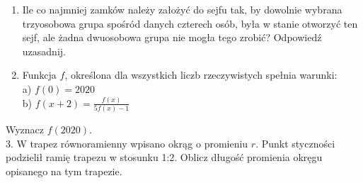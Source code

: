 \documentclass[10pt]{article}
\begin{document}
\begin{enumerate}
  \item Ile co najmniej zamków należy założyć do sejfu tak, by dowolnie wybrana trzyosobowa grupa spośród danych czterech osób, była w stanie otworzyć ten sejf, ale żadna dwuosobowa grupa nie mogła tego zrobić? Odpowiedź uzasadnij.
  \item Funkcja \(f\), określona dla wszystkich liczb rzeczywistych spełnia warunki:\\
a) \(f(0)=2020\)\\
b) \(f(x+2)=\frac{f(x)}{5 f(x)-1}\)
\end{enumerate}

Wyznacz \(f(2020)\).\\
3. W trapez równoramienny wpisano okrąg o promieniu \(r\). Punkt styczności podzielił ramię trapezu w stosunku 1:2. Oblicz długość promienia okręgu opisanego na tym trapezie.
\end{document}
